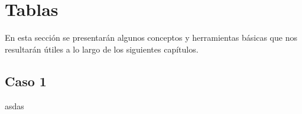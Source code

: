 
\chapter{Tablas}

En esta sección se presentarán algunos conceptos y herramientas básicas que nos resultarán útiles a lo largo de los siguientes capítulos.

\section{Caso 1}

asdas